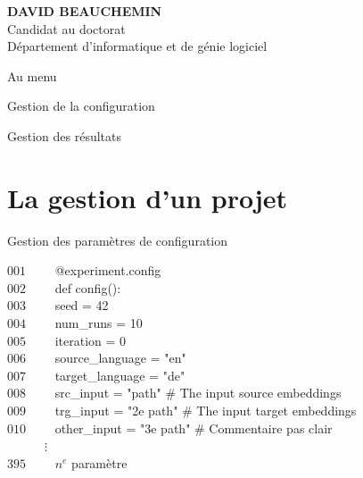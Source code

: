 \documentclass[aspectratio=169,10pt,xcolor=x11names,english,french]{beamer}
\makeatletter
\newenvironment{Scode}{%
	\def\FrameCommand##1{\hskip\@totalleftmargin
		\vrule width 3pt\colorbox{codebg}{\hspace{5pt}##1}%
		\hskip-\linewidth \hskip-\@totalleftmargin \hskip\columnwidth}%
	\MakeFramed {\advance\hsize-\width
		\@totalleftmargin\z@ \linewidth\hsize
		\advance\labelsep\fboxsep
		\@setminipage}%
}{\par\unskip\@minipagefalse\endMakeFramed}
\makeatother
\begin{document}
\begin{frame}
		\begin{minipage}{0.25\linewidth}
			\small
			\textbf{DAVID BEAUCHEMIN} \\
			Candidat au doctorat \\
			Département d'informatique et de génie logiciel
		\end{minipage}
	\end{frame}

	\begin{frame}{Au menu}
		\begin{minipage}{0.49\linewidth}
				\centering
				\fontsize{35}{35}\faCog\vfil
				\vspace{1em}
				\normalsize Gestion de la configuration
				
		\end{minipage}
		\begin{minipage}{0.49\linewidth}
				\centering
				\fontsize{35}{35}\faAreaChart\vfil
				\vspace{1em}
				\normalsize Gestion des résultats
		\end{minipage}
	\end{frame}
	
	\section{La gestion d'un projet}
	\begin{frame}{Gestion des paramètres de configuration}
		\begin{Scode} 
			$001 \qquad$ @experiment.config \\
			$002 \qquad$ def config(): \\
			$003 \qquad$ \quad	seed = 42 \\
			$004 \qquad$ \quad	num\_runs = 10 \\
			$005 \qquad$ \quad	iteration = 0 \\
			$006 \qquad$ \quad	source\_language = "en" \\
			$007 \qquad$ \quad	target\_language = "de" \\
			$008 \qquad$ \quad 	src\_input = "path"  \# The input source embeddings \\
			$009 \qquad$ \quad 	trg\_input = "2e path" \# The input target embeddings \\
			$010 \qquad$ \quad 	other\_input = "3e path" \# Commentaire pas clair \\
			$\:\:\: \qquad$ \quad   $\vdots$ \\
			$395 \qquad$ \quad   $n^e$ paramètre \\
		\end{Scode}
	\end{frame}
\end{document}
